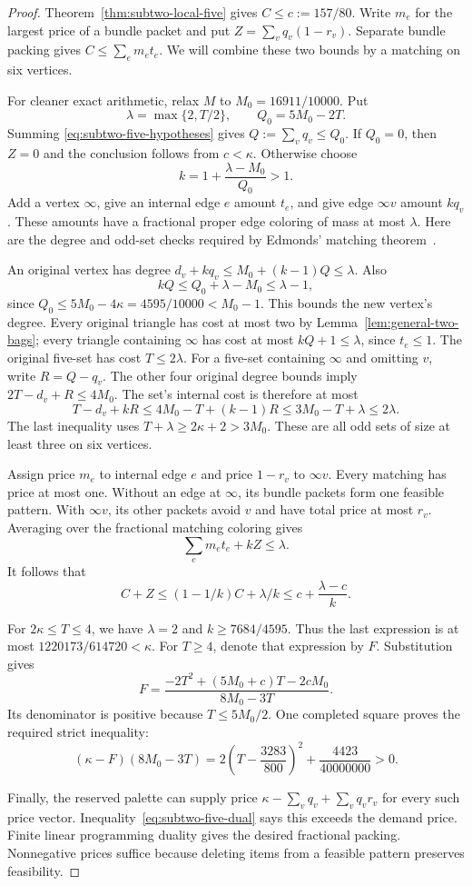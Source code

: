 \documentclass[11pt]{article}
\theoremstyle{definition}\newtheorem{algorithm}{Algorithm}[section]
\numberwithin{equation}{section}
\theoremstyle{remark}\newtheorem*{remark}{Remark}
\begin{document}
\begin{proof}
Theorem~\ref{thm:subtwo-local-five} gives $C\le c:=157/80$.
Write $m_e$ for the largest price of a bundle packet and put
$Z=\sum_vq_v(1-r_v)$. Separate bundle packing gives
$C\le\sum_e m_et_e$.
We will combine these two bounds by a matching on six vertices.

For cleaner exact arithmetic, relax $M$ to
$M_0=16911/10000$. Put
\[
 \lambda=\max\{2,T/2\},\qquad Q_0=5M_0-2T.
\]
Summing \eqref{eq:subtwo-five-hypotheses} gives
$Q:=\sum_vq_v\le Q_0$. If $Q_0=0$, then $Z=0$ and the conclusion
follows from $c<\kappa$. Otherwise choose
\[
 k=1+\frac{\lambda-M_0}{Q_0}>1.
\]
Add a vertex $\infty$, give an internal edge $e$ amount $t_e$,
and give edge $\infty v$ amount $kq_v$. These amounts have a
fractional proper edge coloring of mass at most $\lambda$.
Here are the degree and odd-set checks required by Edmonds'
matching theorem~\cite{Edmonds65}.

An original vertex has degree
$d_v+kq_v\le M_0+(k-1)Q\le\lambda$.
Also
\[
 kQ\le Q_0+\lambda-M_0\le\lambda-1,
\]
since $Q_0\le5M_0-4\kappa=4595/10000<M_0-1$.
This bounds the new vertex's degree. Every original triangle has
cost at most two by Lemma~\ref{lem:general-two-bags}; every triangle
containing $\infty$ has cost at most $kQ+1\le\lambda$, since
$t_e\le1$. The original five-set has cost $T\le2\lambda$.
For a five-set containing $\infty$ and omitting $v$, write
$R=Q-q_v$. The other four original degree bounds imply
$2T-d_v+R\le4M_0$. The set's internal cost is therefore at most
\[
 T-d_v+kR\le4M_0-T+(k-1)R
 \le3M_0-T+\lambda\le2\lambda.
\]
The last inequality uses $T+\lambda\ge2\kappa+2>3M_0$.
These are all odd sets of size at least three on six vertices.

Assign price $m_e$ to internal edge $e$ and price $1-r_v$ to
$\infty v$. Every matching has price at most one. Without an edge
at $\infty$, its bundle packets form one feasible pattern. With
$\infty v$, its other packets avoid $v$ and have total price at
most $r_v$. Averaging over the fractional matching coloring gives
\[
 \sum_e m_et_e+kZ\le\lambda.
\]
It follows that
\begin{equation}\label{eq:subtwo-one-variable-transfer}
 C+Z\le(1-1/k)C+\lambda/k
       \le c+\frac{\lambda-c}{k}.
\end{equation}

For $2\kappa\le T\le4$, we have $\lambda=2$ and
$k\ge7684/4595$. Thus the last expression is at most
$1220173/614720<\kappa$.
For $T\ge4$, denote that expression by $F$. Substitution gives
\[
 F=\frac{-2T^2+(5M_0+c)T-2cM_0}{8M_0-3T}.
\]
Its denominator is positive because $T\le5M_0/2$.
One completed square proves the required strict inequality:
\[
 (\kappa-F)(8M_0-3T)
 =2\left(T-\frac{3283}{800}\right)^2
       +\frac{4423}{40000000}>0.
\]

Finally, the reserved palette can supply price
$\kappa-\sum_vq_v+\sum_vq_vr_v$ for every such price vector.
Inequality~\eqref{eq:subtwo-five-dual} says this exceeds the demand
price. Finite linear programming duality gives the desired fractional
packing. Nonnegative prices suffice because deleting items from a
feasible pattern preserves feasibility.
\end{proof}
\end{document}
